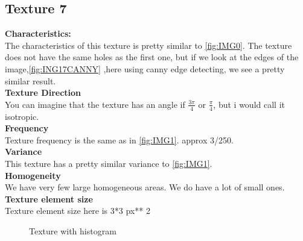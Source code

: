 \documentclass{article}
\begin{document}
\newpage
\subsection{Texture 7}
\textbf{Characteristics:}\\
The characteristics of this texture is pretty similar to \ref{fig:IMG0}.
The texture does not have the same holes as the first one, but if we look at the edges of the image,\ref{fig:ING17CANNY} ,here using canny edge detecting, we see a pretty similar result. 
\\

\textbf{Texture Direction}\\
You can imagine that the texture has an angle if $\frac{3\pi}{4}$ or $\frac{\pi}{4}$, but i would call it isotropic. 
\\ 
 
\textbf{Frequency} \\
Texture frequency is the same as in \ref{fig:IMG1}. approx 3/250. 
\\

\textbf{Variance}\\
This texture has a pretty similar variance to \ref{fig:IMG1}.
\\

\textbf{Homogeneity}\\
We have very few large homogeneous areas. We do have a lot of small ones.
\\

\textbf{Texture element size}\\
Texture element size here is 3*3 px** 2
\\

\begin{figure}[h]%
	\centering
    \qquad
    \caption{Texture with histogram}%
    \label{fig:IMG7}%
\end{figure}
\end{document}
